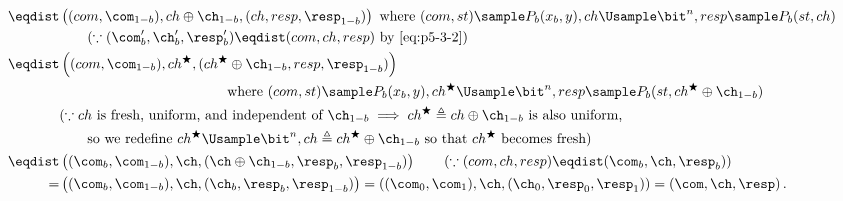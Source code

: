 \begin{answer}
\begin{itemize}
\begin{align*}
            \eqdist& \left( (com, \com_{1-b}), ch\oplus \ch_{1-b}, (ch,  resp, \resp_{1-b}) \right) \textrm{ where } (com, st)\sample P_b(x_b, y), ch\Usample\bit^n, resp\sample P_b(st, ch) \\
            &\qquad (\because  (\com_b', \ch_b', \resp_b') \eqdist(com, ch , resp) \textrm{ by \eqref{eq:p5-3-2}})\\
            \eqdist& \left( (com, \com_{1-b}), {ch}^\bigstar, ({ch}^\bigstar\oplus \ch_{1-b},  resp, \resp_{1-b}) \right)\\
            &\qquad\qquad\qquad\qquad\qquad\qquad \textrm{where }(com, st)\sample P_b(x_b, y), {ch}^\bigstar\Usample\bit^n, resp\sample P_b(st, {ch}^\bigstar\oplus \ch_{1-b}) \\
            & (\because  ch \textrm{ is fresh, uniform, and independent of } \ch_{1-b} \implies {ch}^\bigstar\triangleq ch\oplus \ch_{1-b} \textrm{ is also uniform,}\\
            &\qquad \textrm{so we redefine }  {ch}^\bigstar \Usample\bit^n, ch\triangleq {ch}^\bigstar\oplus \ch_{1-b} \textrm{ so that } {ch}^\bigstar \textrm{ becomes fresh})\\
            \eqdist& \left( (\com_b, \com_{1-b}), \ch, (\ch\oplus \ch_{1-b},  \resp_b, \resp_{1-b}) \right) \qquad (\because (com, ch, resp)\eqdist (\com_b, \ch, \resp_b))\\
            =& \left( (\com_b, \com_{1-b}), \ch, (\ch_b,  \resp_b, \resp_{1-b}) \right)
            = \left( (\com_0, \com_{1}), \ch, (\ch_0,  \resp_0, \resp_{1}) \right)
            = \left(\com, \ch, \resp\right).
        \end{align*} 


\end{itemize}
\end{answer}
